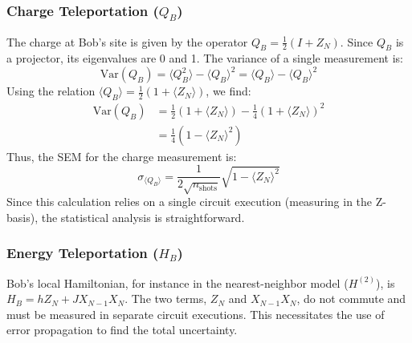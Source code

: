 \subsubsection{Charge Teleportation (\texorpdfstring{$Q_B$}{QB})}
The charge at Bob's site is given by the operator $Q_B = \frac{1}{2}(I + Z_N)$. Since $Q_B$ is a projector, its eigenvalues are 0 and 1. The variance of a single measurement is:
\begin{equation}
    \text{Var}(Q_B) = \langle Q_B^2 \rangle - \langle Q_B \rangle^2 = \langle Q_B \rangle - \langle Q_B \rangle^2
\end{equation}
Using the relation $\langle Q_B \rangle = \frac{1}{2}(1 + \langle Z_N \rangle)$, we find:
\begin{equation}
    \begin{aligned}
        \text{Var}(Q_B) &= \frac{1}{2}(1 + \langle Z_N \rangle) - \frac{1}{4}(1 + \langle Z_N \rangle)^2 \\
        &= \frac{1}{4}(1 - \langle Z_N \rangle^2)
    \end{aligned}
\end{equation}
Thus, the SEM for the charge measurement is:
\begin{equation}
    \sigma_{\langle Q_B \rangle} = \frac{1}{2\sqrt{n_{\text{shots}}}} \sqrt{1 - \langle Z_N \rangle^2}
\end{equation}
Since this calculation relies on a single circuit execution (measuring in the Z-basis), the statistical analysis is straightforward.

\subsubsection{Energy Teleportation (\texorpdfstring{$H_B$}{HB})}
Bob's local Hamiltonian, for instance in the nearest-neighbor model ($H^{(2)}$), is $H_B = hZ_N + JX_{N-1}X_N$. The two terms, $Z_N$ and $X_{N-1}X_N$, do not commute and must be measured in separate circuit executions. This necessitates the use of error propagation to find the total uncertainty.

